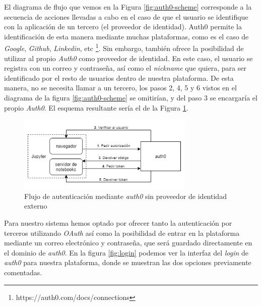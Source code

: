 \documentclass[11pt,spanish,listoffigures,listoftables]{tfgetsinf}
\begin{document}
El diagrama de flujo que vemos en la Figura \ref{fig:auth0-scheme} corresponde a la secuencia de acciones llevadas a cabo en el caso de que el usuario se identifique con la aplicación de un tercero (el proveedor de identidad). Auth0 permite la identificación de esta manera mediante muchas plataformas, como es el caso de \textit{Google}, \textit{Github}, \textit{Linkedin}, etc \footnote{https://auth0.com/docs/connections}. Sin embargo, también ofrece la posibilidad de utilizar al propio \textit{Auth0} como proveedor de identidad. En este caso, el usuario se registra con un correo y contraseña, así como el \textit{nickname} que quiera, para ser identificado por el resto de usuarios dentro de nuestra plataforma. De esta manera, no se necesita llamar a un tercero, los pasos 2, 4, 5 y 6 vistos en el diagrama de la figura \ref{fig:auth0-scheme} se omitirían, y del paso 3 se encargaría el propio \textit{Auth0}. El esquema resultante sería el de la Figura \ref{fig:auth0-scheme-2}.  

\begin{figure}[h]
	\centering
  	\includegraphics[width=0.75\textwidth]{auth0-flow2.png}
  	\caption{Flujo de autenticación mediante \textit{auth0} sin proveedor de identidad externo}
  	\label{fig:auth0-scheme-2}
\end{figure}

Para nuestro sistema hemos optado por ofrecer tanto la autenticación por terceros utilizando \textit{OAuth} así como la posibilidad de entrar en la plataforma mediante un correo electrónico y contraseña, que será guardado directamente en el dominio de \textit{auth0}. En la figura \ref{fig:login} podemos ver la interfaz del \textit{login} de \textit{auth0} para nuestra plataforma, donde se muestran las dos opciones previamente comentadas.
\end{document}
